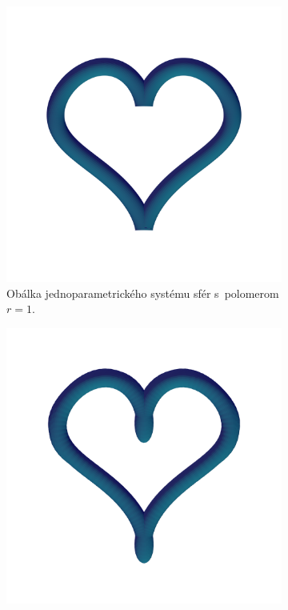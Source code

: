 \begin{figure}[h]
\begin{subfigure}[t]{0.49\textwidth}
        \includegraphics[width=\textwidth, trim=0mm 100mm 0mm 50mm, clip=true]{images/heart_spheres_envelope.png}
        	\caption{Obálka jednoparametrického systému sfér s~polomerom $r=1$.}
        \label{fig:plocha12}
    \end{subfigure}
    \hfill
    \begin{subfigure}[t]{0.49\textwidth}
        \centering
        \includegraphics[width=\textwidth, trim=0mm 50mm 0mm 50mm, clip=true]{images/heart_ellipsoids.png}

\end{subfigure}
\end{figure}
